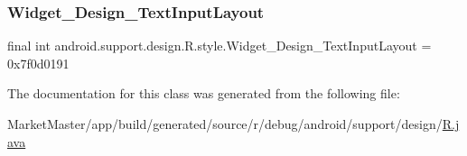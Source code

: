 \subsubsection{\texorpdfstring{Widget\+\_\+\+Design\+\_\+\+Text\+Input\+Layout}{Widget\_Design\_TextInputLayout}}
{\footnotesize\ttfamily final int android.\+support.\+design.\+R.\+style.\+Widget\+\_\+\+Design\+\_\+\+Text\+Input\+Layout = 0x7f0d0191\hspace{0.3cm}{\ttfamily [static]}}



The documentation for this class was generated from the following file\+:\begin{DoxyCompactItemize}
\item 
Market\+Master/app/build/generated/source/r/debug/android/support/design/\mbox{\hyperlink{debug_2android_2support_2design_2R_8java}{R.\+java}}\end{DoxyCompactItemize}
